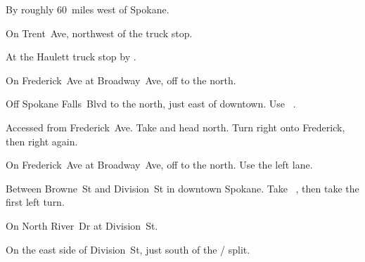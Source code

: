 
\begin{LocationList}

By  roughly 60~miles west of Spokane. %

\Location{\GarageHQ \Garage}
On Trent~Ave, northwest of the truck stop.

At the Haulett truck stop by  .

On Frederick~Ave at Broadway~Ave, off   to the north.

Off Spokane Falls~Blvd to the north, just east of downtown.
Use~ .

Accessed from Frederick~Ave.
Take   and head north.
Turn right onto Frederick, then right again.

On Frederick~Ave at Broadway~Ave, off   to the north.
Use the left lane.

Between Browne~St and Division~St in downtown Spokane.
Take~ , then take the first left turn.

On North River~Dr at   Division~St.

On the east side of Division~St, just south of the  /  split.

\end{LocationList}
